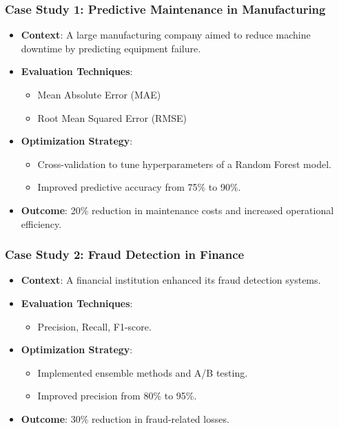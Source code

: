 \documentclass[aspectratio=169]{beamer}
\begin{document}
\begin{frame}[fragile]
    \frametitle{Case Study 1: Predictive Maintenance in Manufacturing}
    \begin{itemize}
        \item \textbf{Context}: A large manufacturing company aimed to reduce machine downtime by predicting equipment failure.
        \item \textbf{Evaluation Techniques}: 
            \begin{itemize}
                \item Mean Absolute Error (MAE)
                \item Root Mean Squared Error (RMSE)
            \end{itemize}
        \item \textbf{Optimization Strategy}: 
            \begin{itemize}
                \item Cross-validation to tune hyperparameters of a Random Forest model.
                \item Improved predictive accuracy from 75\% to 90\%.
            \end{itemize}
        \item \textbf{Outcome}: 20\% reduction in maintenance costs and increased operational efficiency.
    \end{itemize}
\end{frame}

\begin{frame}[fragile]
    \frametitle{Case Study 2: Fraud Detection in Finance}
    \begin{itemize}
        \item \textbf{Context}: A financial institution enhanced its fraud detection systems.
        \item \textbf{Evaluation Techniques}: 
            \begin{itemize}
                \item Precision, Recall, F1-score.
            \end{itemize}
        \item \textbf{Optimization Strategy}: 
            \begin{itemize}
                \item Implemented ensemble methods and A/B testing.
                \item Improved precision from 80\% to 95\%.
            \end{itemize}
        \item \textbf{Outcome}: 30\% reduction in fraud-related losses.
    \end{itemize}
\end{frame}
\end{document}
